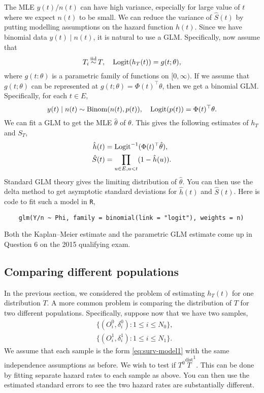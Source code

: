 The MLE $y(t)/n(t)$ can have high variance, especially for large value of $t$ where we expect $n(t)$ to be small. We can reduce the variance of $\hat{S}(t)$ by putting modelling assumptions on the hazard function $h(t)$. Since we have binomial data $y(t)\mid n(t)$, it is natural to use a GLM. Specifically, now assume that
\[
    T_i \simiid T, \quad \logit( h_T(t)) = g(t;\theta),
\] 
where $g(t:\theta)$ is a parametric family of functions on $[0,\infty)$. If we assume that $g(t;\theta)$ can be represented at $g(t;\theta) = \Phi(t)^\top \theta$, then we get a binomial GLM. Specifically, for each $t \in E$,
\[ 
    y(t) \mid n(t) \sim \mathrm{Binom}(n(t), p(t)), \quad \mathrm{Logit}(p(t)) = \Phi(t)^\top \theta.    
\]
We can fit a GLM to get the MLE $\hat{\theta}$ of $\theta$. This gives the following estimates of $h_T$ and $S_T$,
\begin{align*}
    \hat{h}(t)&=\mathrm{Logit}^{-1}(\Phi(t)^\top \hat{\theta}),\\
    \hat{S}(t)&=\prod_{u \in E, u < t}(1-\hat{h}(u)).
\end{align*}
Standard GLM theory gives the limiting distribution of $\hat{\theta}$. You can then use the delta method to get asymptotic standard deviations for $\hat{h}(t)$ and $\hat{S}(t)$. Here is code to fit such a model in \verb|R|,

\begin{verbatim} 
    glm(Y/n ~ Phi, family = binomial(link = "logit"), weights = n) 
\end{verbatim}

Both the Kaplan--Meier estimate and the parametric GLM estimate come up in Question 6 on the 2015 qualifying exam.

\subsection{Comparing different populations}

In the previous section, we considered the problem of estimating $h_T(t)$ for one distribution $T$. A more common problem is comparing the distribution of $T$ for two different populations. Specifically, suppose now that we have two samples,
\begin{align*}
    &\{(O_i^0,\delta_i^0):1 \le i \le N_0\},\\
    &\{(O_i^1,\delta_i^1) : 1 \le i \le N_1\}.
\end{align*}
We assume that each sample is the form \eqref{eq:surv-model1} with the same independence assumptions as before. We wish to test if $T^0 \stackrel{\text{dist}} T^1$. This can be done by fitting separate hazard rates to each sample as above. You can then use the estimated standard errors to see the two hazard rates are substantially different.

